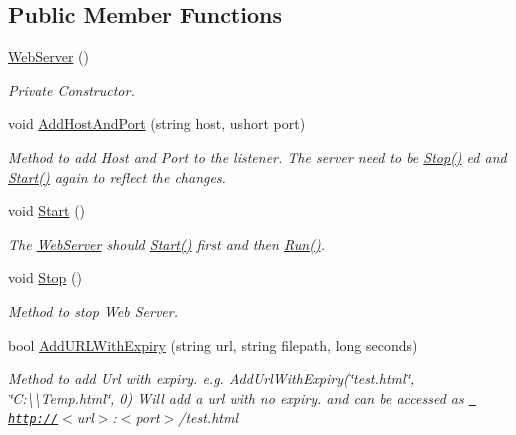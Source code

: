 \subsection*{Public Member Functions}
\begin{DoxyCompactItemize}
\item 
\mbox{\hyperlink{class_concord_1_1_c3_http_module_1_1_web_server_a1f9e775ee54aa91662039d7f1a549193}{Web\+Server}} ()
\begin{DoxyCompactList}\small\item\em Private Constructor. \end{DoxyCompactList}\item 
void \mbox{\hyperlink{class_concord_1_1_c3_http_module_1_1_web_server_a3a0d02f87177a358cdf1442828829221}{Add\+Host\+And\+Port}} (string host, ushort port)
\begin{DoxyCompactList}\small\item\em Method to add Host and Port to the listener. The server need to be \mbox{\hyperlink{class_concord_1_1_c3_http_module_1_1_web_server_a9e75b9b9d1eb2c58a1be558bf9182087}{Stop()}} ed and \mbox{\hyperlink{class_concord_1_1_c3_http_module_1_1_web_server_ac95e30c39f5d922e6043377ccac20e6d}{Start()}} again to reflect the changes. \end{DoxyCompactList}\item 
void \mbox{\hyperlink{class_concord_1_1_c3_http_module_1_1_web_server_ac95e30c39f5d922e6043377ccac20e6d}{Start}} ()
\begin{DoxyCompactList}\small\item\em The \mbox{\hyperlink{class_concord_1_1_c3_http_module_1_1_web_server}{Web\+Server}} should \mbox{\hyperlink{class_concord_1_1_c3_http_module_1_1_web_server_ac95e30c39f5d922e6043377ccac20e6d}{Start()}} first and then \mbox{\hyperlink{class_concord_1_1_c3_http_module_1_1_web_server_a25053b2c9397975cf48565d98b9c2d9e}{Run()}}. \end{DoxyCompactList}\item 
void \mbox{\hyperlink{class_concord_1_1_c3_http_module_1_1_web_server_a9e75b9b9d1eb2c58a1be558bf9182087}{Stop}} ()
\begin{DoxyCompactList}\small\item\em Method to stop Web Server. \end{DoxyCompactList}\item 
bool \mbox{\hyperlink{class_concord_1_1_c3_http_module_1_1_web_server_abd3b7b52f0a3190e8b36a0d45cd99574}{Add\+U\+R\+L\+With\+Expiry}} (string url, string filepath, long seconds)
\begin{DoxyCompactList}\small\item\em Method to add Url with expiry. e.\+g. Add\+Url\+With\+Expiry(\char`\"{}test.\+html\char`\"{}, \char`\"{}\+C\+:\textbackslash{}\textbackslash{}\+Temp.\+html\char`\"{}, 0) Will add a url with no expiry. and can be accessed as \href{http://}{\texttt{ http\+://}}$<$url$>$\+:$<$port$>$/test.html \end{DoxyCompactList}\item 

\end{DoxyCompactItemize}
